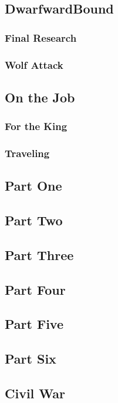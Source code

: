 

\subsection{DwarfwardBound}


\subsubsection{Final Research}


\subsubsection{Wolf Attack}


\subsection{On the Job}


\subsubsection{For the King}


\subsubsection{Traveling}


\subsection{Part One}


\subsection{Part Two}


\subsection{Part Three}


\subsection{Part Four}


\subsection{Part Five}


\subsection{Part Six}


\subsection{Civil War}

